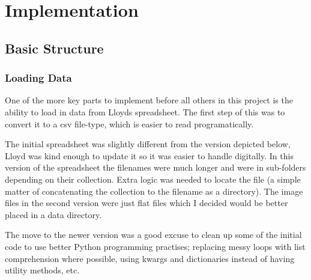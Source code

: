 \chapter{Implementation}



\section{Basic Structure}

\subsection{Loading Data}
One of the more key parts to implement before all others in this project is the ability to load in
data from Lloyds spreadsheet. The first step of this was to convert it to a \gls{csv} file-type,
which is easier to read programatically.

The initial spreadsheet was slightly different from the version depicted below, Lloyd was kind 
enough to update it so it was easier to handle digitally. In this version of the spreadsheet the
filenames were much longer and were in sub-folders depending on their collection. Extra logic was
needed to locate the file (a simple matter of concatenating the collection to the filename as a
directory). The image files in the second version were just flat files which I decided would be
better placed in a data directory.

The move to the newer version was a good excuse to clean up some of the initial code to use better
Python programming practises; replacing messy loops with list comprehension where possible, using
\gls{kwargs} and dictionaries instead of having utility methods, etc.

